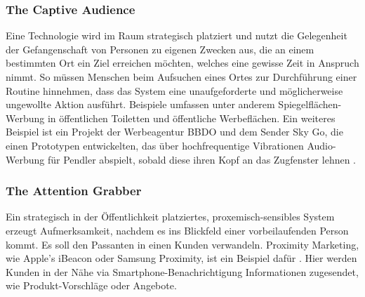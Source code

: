 \documentclass[a4paper]{article}
\begin{document}
\subsubsection{The Captive Audience}
Eine Technologie wird im Raum strategisch platziert und nutzt die Gelegenheit der \glqq Gefangenschaft\grqq{} von Personen zu eigenen Zwecken aus, die an einem bestimmten Ort ein Ziel erreichen möchten, welches eine gewisse Zeit in Anspruch nimmt. So müssen Menschen beim Aufsuchen eines Ortes zur Durchführung einer Routine hinnehmen, dass das System eine unaufgeforderte und möglicherweise ungewollte Aktion ausführt.\newline
Beispiele umfassen unter anderem Spiegelflächen-Werbung in öffentlichen Toiletten \cite{youtube} und öffentliche Werbeflächen. Ein weiteres Beispiel ist ein Projekt der Werbeagentur BBDO und dem Sender Sky Go, die einen Prototypen entwickelten, das über hochfrequentige Vibrationen Audio-Werbung für Pendler abspielt, sobald diese ihren Kopf an das Zugfenster lehnen \cite{zugfenster_ad}.  

\subsubsection{The Attention Grabber}
Ein strategisch in der Öffentlichkeit platziertes, proxemisch-sensibles System erzeugt Aufmerksamkeit, nachdem es ins Blickfeld einer vorbeilaufenden Person kommt. Es soll den Passanten in einen Kunden verwandeln.\newline
Proximity Marketing, wie Apple's iBeacon oder Samsung Proximity, ist ein Beispiel dafür \cite{proximity_marketing} \cite{proximity_marketing2}. Hier werden Kunden in der Nähe via Smartphone-Benachrichtigung Informationen zugesendet, wie Produkt-Vorschläge oder Angebote.
\end{document}
